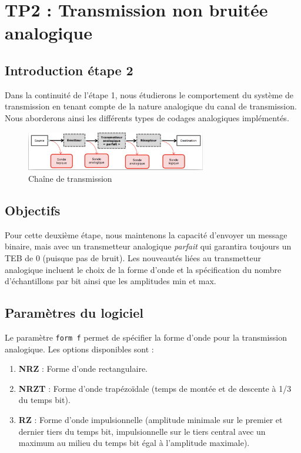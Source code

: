 \section{TP2 : Transmission non bruitée analogique}

\subsection{Introduction étape 2}
Dans la continuité de l'étape 1, nous étudierons le comportement du système de transmission en tenant compte de la nature analogique du canal de transmission. Nous aborderons ainsi les différents types de codages analogiques implémentés.

\begin{figure}[H]
    \centering
    \includegraphics[width=0.7\textwidth]{img/etape2_chaine_transmission.png}
    \caption{Chaîne de transmission}
    \label{fig:chaine_transmission}
\end{figure}

\subsection{Objectifs}
Pour cette deuxième étape, nous maintenons la capacité d'envoyer un message binaire, mais avec un transmetteur analogique \textit{parfait} qui garantira toujours un TEB de 0 (puisque pas de bruit). Les nouveautés liées au transmetteur analogique incluent le choix de la forme d'onde et la spécification du nombre d'échantillons par bit ainsi que les amplitudes min et max.

\subsection{Paramètres du logiciel}
Le paramètre \texttt{form f} permet de spécifier la forme d'onde pour la transmission analogique. Les options disponibles sont :

\begin{enumerate}
    \item \textbf{NRZ} : Forme d'onde rectangulaire.
    \item \textbf{NRZT} : Forme d'onde trapézoïdale (temps de montée et de descente à 1/3 du temps bit).
    \item \textbf{RZ} : Forme d'onde impulsionnelle (amplitude minimale sur le premier et dernier tiers du temps bit, impulsionnelle sur le tiers central avec un maximum au milieu du temps bit égal à l'amplitude maximale).
\end{enumerate}

